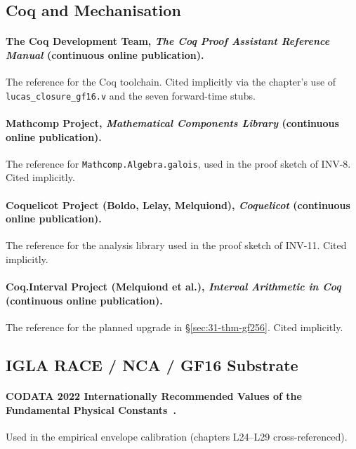 \subsection{Coq and Mechanisation}
\label{sec:31-refs-coq}

\paragraph{The Coq Development Team, \emph{The Coq Proof Assistant Reference Manual} (continuous online publication).} The reference for the Coq toolchain. Cited implicitly via the chapter's use of \texttt{lucas\_closure\_gf16.v} and the seven forward-time stubs.

\paragraph{Mathcomp Project, \emph{Mathematical Components Library} (continuous online publication).} The reference for \texttt{Mathcomp.Algebra.galois}, used in the proof sketch of INV-8. Cited implicitly.

\paragraph{Coquelicot Project (Boldo, Lelay, Melquiond), \emph{Coquelicot} (continuous online publication).} The reference for the analysis library used in the proof sketch of INV-11. Cited implicitly.

\paragraph{Coq.Interval Project (Melquiond et al.), \emph{Interval Arithmetic in Coq} (continuous online publication).} The reference for the planned upgrade in §\ref{sec:31-thm-gf256}. Cited implicitly.

\subsection{IGLA RACE / NCA / GF16 Substrate}
\label{sec:31-refs-igla}

\paragraph{CODATA 2022 Internationally Recommended Values of the Fundamental Physical Constants~\cite{codata2022}.} Used in the empirical envelope calibration (chapters L24–L29 cross-referenced).

